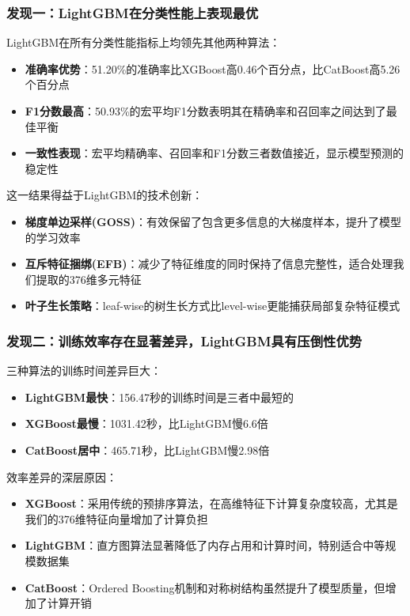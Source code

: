 \documentclass[UTF8]{report}
\theoremstyle{MyLineTheoremStyle} %
\theoremstyle{MyBlockTheoremStyle} %
\theoremstyle{MySubsubsectionStyle} %
\begin{document}
\subsubsection{发现一：LightGBM在分类性能上表现最优}
LightGBM在所有分类性能指标上均领先其他两种算法：
\begin{itemize}
    \item \textbf{准确率优势}：51.20\%的准确率比XGBoost高0.46个百分点，比CatBoost高5.26个百分点
    \item \textbf{F1分数最高}：50.93\%的宏平均F1分数表明其在精确率和召回率之间达到了最佳平衡
    \item \textbf{一致性表现}：宏平均精确率、召回率和F1分数三者数值接近，显示模型预测的稳定性
\end{itemize}
这一结果得益于LightGBM的技术创新：
\begin{itemize}
    \item \textbf{梯度单边采样(GOSS)}：有效保留了包含更多信息的大梯度样本，提升了模型的学习效率
    \item \textbf{互斥特征捆绑(EFB)}：减少了特征维度的同时保持了信息完整性，适合处理我们提取的376维多元特征
    \item \textbf{叶子生长策略}：leaf-wise的树生长方式比level-wise更能捕获局部复杂特征模式
\end{itemize}

\subsubsection{发现二：训练效率存在显著差异，LightGBM具有压倒性优势}
三种算法的训练时间差异巨大：
\begin{itemize}
    \item \textbf{LightGBM最快}：156.47秒的训练时间是三者中最短的
    \item \textbf{XGBoost最慢}：1031.42秒，比LightGBM慢6.6倍
    \item \textbf{CatBoost居中}：465.71秒，比LightGBM慢2.98倍
\end{itemize}
效率差异的深层原因：
\begin{itemize}
    \item \textbf{XGBoost}：采用传统的预排序算法，在高维特征下计算复杂度较高，尤其是我们的376维特征向量增加了计算负担
    \item \textbf{LightGBM}：直方图算法显著降低了内存占用和计算时间，特别适合中等规模数据集
    \item \textbf{CatBoost}：Ordered Boosting机制和对称树结构虽然提升了模型质量，但增加了计算开销
\end{itemize}
\end{document}
